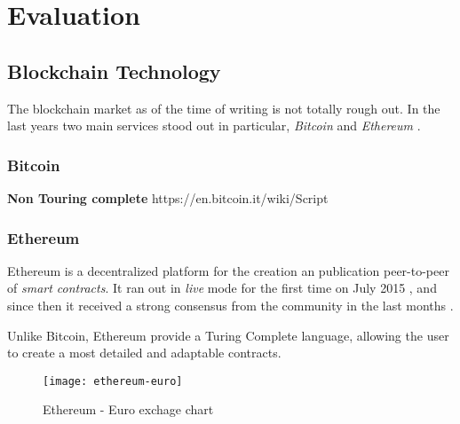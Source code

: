 \chapter{Evaluation}
\label{evaluation}

\section{Blockchain Technology}

The blockchain market as of the time of writing is not totally rough out. In the last years two main services stood out in particular, \textit{Bitcoin} \citep{BitcoinMainPage} and \textit{Ethereum} \citep{EthereumMainPage}.

\subsection{Bitcoin}

\textbf{Non Touring complete} https://en.bitcoin.it/wiki/Script


\subsection{Ethereum}
Ethereum is a decentralized platform for the creation an publication peer-to-peer of \textit{smart contracts}.
It ran out in \textit{live} mode for the first time on July 2015 \citep{EthereumLaunch}, and since then it received a strong consensus from the community in the last months \citep{EthereumEuroChart}.

Unlike Bitcoin, Ethereum provide a Turing Complete language, allowing the user to create a most detailed and adaptable contracts.

\begin{figure}[ht]
  \vspace{2em}
	\centering
  \texttt{[image: ethereum-euro]}
	\caption{Ethereum - Euro exchage chart}
	\label{fig1}
\end{figure}

